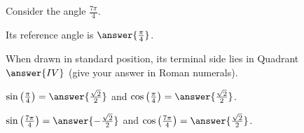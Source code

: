 \documentclass{ximera}
\author{Kenneth Berglund}
\begin{document}
\begin{exercise}
Consider the angle $\frac{7\pi}{4}$. 

Its reference angle is $\answer{\frac{\pi}{4}}$.

When drawn in standard position, its terminal side lies in Quadrant $\answer{IV}$ (give your answer in Roman numerals). 

\begin{exercise}
$\sin\left(\frac{\pi}{4}\right) = \answer{\frac{\sqrt{2}}{2}}$ and $\cos\left(\frac{\pi}{4}\right) = \answer{\frac{\sqrt{2}}{2}}$.

\begin{exercise}
$\sin\left(\frac{7\pi}{4}\right) = \answer{-\frac{\sqrt{2}}{2}}$ and $\cos\left(\frac{7\pi}{4}\right) = \answer{\frac{\sqrt{2}}{2}}$.
\end{exercise}
\end{exercise}

\end{exercise}
\end{document}
